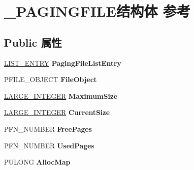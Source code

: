 \hypertarget{struct___p_a_g_i_n_g_f_i_l_e}{}\section{\+\_\+\+P\+A\+G\+I\+N\+G\+F\+I\+L\+E结构体 参考}
\label{struct___p_a_g_i_n_g_f_i_l_e}
\subsection*{Public 属性}
\begin{DoxyCompactItemize}
\item 
\mbox{\label{struct___p_a_g_i_n_g_f_i_l_e_ac9a2e5d3f92bf80dc96c57a905fe7f37}} 
\hyperlink{struct___l_i_s_t___e_n_t_r_y}{L\+I\+S\+T\+\_\+\+E\+N\+T\+RY} {\bfseries Paging\+File\+List\+Entry}
\item 
\mbox{\label{struct___p_a_g_i_n_g_f_i_l_e_a8940e121714e693589497c20b1c5d151}} 
P\+F\+I\+L\+E\+\_\+\+O\+B\+J\+E\+CT {\bfseries File\+Object}
\item 
\mbox{\label{struct___p_a_g_i_n_g_f_i_l_e_a19f4d1a58b66b18adc4693e512d19a1f}} 
\hyperlink{union___l_a_r_g_e___i_n_t_e_g_e_r}{L\+A\+R\+G\+E\+\_\+\+I\+N\+T\+E\+G\+ER} {\bfseries Maximum\+Size}
\item 
\mbox{\label{struct___p_a_g_i_n_g_f_i_l_e_ae928044c480db584169e47b80f98f222}} 
\hyperlink{union___l_a_r_g_e___i_n_t_e_g_e_r}{L\+A\+R\+G\+E\+\_\+\+I\+N\+T\+E\+G\+ER} {\bfseries Current\+Size}
\item 
\mbox{\label{struct___p_a_g_i_n_g_f_i_l_e_aa2f5ca54985f63902495a3b82e2db354}} 
P\+F\+N\+\_\+\+N\+U\+M\+B\+ER {\bfseries Free\+Pages}
\item 
\mbox{\label{struct___p_a_g_i_n_g_f_i_l_e_ac6ba3518f48fc906c7422edfc00bdee0}} 
P\+F\+N\+\_\+\+N\+U\+M\+B\+ER {\bfseries Used\+Pages}
\item 
\mbox{\label{struct___p_a_g_i_n_g_f_i_l_e_a45e4f1d3b10491499693adbbccd31a7e}} 
P\+U\+L\+O\+NG {\bfseries Alloc\+Map}
\item 

\end{DoxyCompactItemize}
